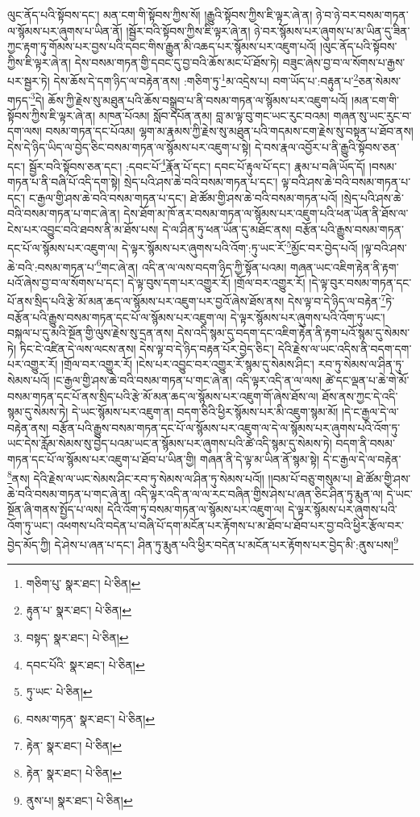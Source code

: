 ལུང་ནོད་པའི་སྟོབས་དང་། མན་ངག་གི་སྟོབས་ཀྱིས་སོ། །རྒྱུའི་སྟོབས་ཀྱིས་ཇི་ལྟར་ཞེ་ན། ཉེ་བ་ཉེ་བར་བསམ་གཏན་ལ་སྙོམས་པར་ཞུགས་པ་ཡིན་ནོ། །སྦྱོར་བའི་སྟོབས་ཀྱིས་ཇི་ལྟར་ཞེ་ན། ཉེ་བར་སྙོམས་པར་ཞུགས་པ་མ་ཡིན་དུ་ཟིན་ཀྱང་རྟག་ཏུ་གོམས་པར་བྱས་པའི་དབང་གིས་རྒྱུན་མི་འཆད་པར་སྙོམས་པར་འཇུག་པའོ། །ལུང་ནོད་པའི་སྟོབས་ཀྱིས་ཇི་ལྟར་ཞེ་ན། དེས་བསམ་གཏན་གྱི་དབང་དུ་བྱ་བའི་ཆོས་མང་པོ་ཐོས་ཏེ། བཟུང་ཞེས་བྱ་བ་ལ་སོགས་པ་རྒྱས་པར་སྦྱར་ཏེ། དེས་ཆོས་དེ་དག་ཉིད་ལ་བརྟེན་ནས། :གཅིག་ཏུ་\footnote{གཅིག་པུ་  སྣར་ཐང་།  པེ་ཅིན། }མ་འདྲེས་པ། བག་ཡོད་པ་:བརྟུན་པ་\footnote{རྟུན་པ་  སྣར་ཐང་།  པེ་ཅིན། }ཅན་སེམས་གཏད་\footnote{བསྟད་  སྣར་ཐང་།  པེ་ཅིན། }དེ། ཆོས་ཀྱི་རྗེས་སུ་མཐུན་པའི་ཆོས་བསྒྲུབ་པ་ནི་བསམ་གཏན་ལ་སྙོམས་པར་འཇུག་པའོ། །མན་ངག་གི་སྟོབས་ཀྱིས་ཇི་ལྟར་ཞེ་ན། མཁན་པོའམ། སློབ་དཔོན་ནམ། བླ་མ་ལྟ་བུ་གང་ཡང་རུང་བའམ། གཞན་སུ་ཡང་རུང་བ་དག་ལས། བསམ་གཏན་དང་པོའམ། ལྷག་མ་རྣམས་ཀྱི་རྗེས་སུ་མཐུན་པའི་གདམས་ངག་རྗེས་སུ་བསྟན་པ་ཐོབ་ནས། དེས་དེ་ཉིད་ཡིད་ལ་བྱེད་ཅིང་བསམ་གཏན་ལ་སྙོམས་པར་འཇུག་པ་སྟེ། དེ་བས་རྣལ་འབྱོར་པ་ནི་རྒྱུའི་སྟོབས་ཅན་དང་། སྦྱོར་བའི་སྟོབས་ཅན་དང་། :དབང་པོ་\footnote{དབང་པོའི་  སྣར་ཐང་།  པེ་ཅིན། }རྣོན་པོ་དང་། དབང་པོ་རྟུལ་པོ་དང་། རྣམ་པ་བཞི་ཡོད་དོ། །བསམ་གཏན་པ་ནི་བཞི་པོ་འདི་དག་སྟེ། སྲེད་པའི་ཤས་ཆེ་བའི་བསམ་གཏན་པ་དང་། ལྟ་བའི་ཤས་ཆེ་བའི་བསམ་གཏན་པ་དང་། ང་རྒྱལ་གྱི་ཤས་ཆེ་བའི་བསམ་གཏན་པ་དང་། ཐེ་ཚོམ་གྱི་ཤས་ཆེ་བའི་བསམ་གཏན་པའོ། །སྲེད་པའི་ཤས་ཆེ་བའི་བསམ་གཏན་པ་གང་ཞེ་ན། དེས་ཐོག་མ་ཁོ་ནར་བསམ་གཏན་ལ་སྙོམས་པར་འཇུག་པའི་ཕན་ཡོན་ནི་ཐོས་ལ་ངེས་པར་འབྱུང་བའི་ཐབས་ནི་མ་ཐོས་པས། དེ་ལ་ཤིན་ཏུ་ཕན་ཡོན་དུ་མཐོང་ནས། བརྩོན་པའི་རྒྱུས་བསམ་གཏན་དང་པོ་ལ་སྙོམས་པར་འཇུག་ལ། དེ་ལྟར་སྙོམས་པར་ཞུགས་པའི་འོག་:ཏུ་ཡང་རོ་\footnote{ཏུ་ཡང་  པེ་ཅིན། }མྱོང་བར་བྱེད་པའོ། །ལྟ་བའི་ཤས་ཆེ་བའི་:བསམ་གཏན་པ་\footnote{བསམ་གཏན་  སྣར་ཐང་།  པེ་ཅིན། }གང་ཞེ་ན། འདི་ན་ལ་ལས་བདག་ཉིད་ཀྱི་སྟོན་པའམ། གཞན་ཡང་འཇིག་རྟེན་ནི་རྟག་པའོ་ཞེས་བྱ་བ་ལ་སོགས་པ་དང་། དེ་ལྟ་བུས་དག་པར་འགྱུར་རོ། །གྲོལ་བར་འགྱུར་རོ། །དེ་ལྟ་བུར་བསམ་གཏན་དང་པོ་ནས་སྲིད་པའི་རྩེ་མོ་མན་ཆད་ལ་སྙོམས་པར་འཇུག་པར་བྱའོ་ཞེས་ཐོས་ནས། དེས་ལྟ་བ་དེ་ཉིད་ལ་བརྟེན་\footnote{རྟེན་  སྣར་ཐང་།  པེ་ཅིན། }ཏེ་བརྩོན་པའི་རྒྱུས་བསམ་གཏན་དང་པོ་ལ་སྙོམས་པར་འཇུག་ལ། དེ་ལྟར་སྙོམས་པར་ཞུགས་པའི་འོག་ཏུ་ཡང་། བསྐལ་པ་དུ་མའི་སྔོན་གྱི་ལུས་རྗེས་སུ་དྲན་ནས། དེས་འདི་སྙམ་དུ་བདག་དང་འཇིག་རྟེན་ནི་རྟག་པའོ་སྙམ་དུ་སེམས་ཏེ། ཏིང་ངེ་འཛིན་དེ་ལས་ལངས་ནས། དེས་ལྟ་བ་དེ་ཉིད་བརྟན་པོར་བྱེད་ཅིང་། དེའི་རྗེས་ལ་ཡང་འདིས་ནི་བདག་དག་པར་འགྱུར་རོ། །གྲོལ་བར་འགྱུར་རོ། །ངེས་པར་འབྱུང་བར་འགྱུར་རོ་སྙམ་དུ་སེམས་ཤིང་། རབ་ཏུ་སེམས་ལ་ཤིན་ཏུ་སེམས་པའོ། །ང་རྒྱལ་གྱི་ཤས་ཆེ་བའི་བསམ་གཏན་པ་གང་ཞེ་ན། འདི་ལྟར་འདི་ན་ལ་ལས། ཚེ་དང་ལྡན་པ་ཆེ་གེ་མོ་བསམ་གཏན་དང་པོ་ནས་སྲིད་པའི་རྩེ་མོ་མན་ཆད་ལ་སྙོམས་པར་འཇུག་གོ་ཞེས་ཐོས་ལ། ཐོས་ནས་ཀྱང་དེ་འདི་སྙམ་དུ་སེམས་ཏེ། དེ་ཡང་སྙོམས་པར་འཇུག་ན། བདག་ཅིའི་ཕྱིར་སྙོམས་པར་མི་འཇུག་སྙམ་མོ། །དེ་ང་རྒྱལ་དེ་ལ་བརྟེན་ནས། བརྩོན་པའི་རྒྱུས་བསམ་གཏན་དང་པོ་ལ་སྙོམས་པར་འཇུག་ལ་དེ་ལ་སྙོམས་པར་ཞུགས་པའི་འོག་ཏུ་ཡང་དེས་རློམ་སེམས་སུ་བྱེད་པའམ་ཡང་ན་སྙོམས་པར་ཞུགས་པའི་ཚེ་འདི་སྙམ་དུ་སེམས་ཏེ། བདག་ནི་བསམ་གཏན་དང་པོ་ལ་སྙོམས་པར་འཇུག་པ་ཐོབ་པ་ཡིན་གྱི། གཞན་ནི་དེ་ལྟ་མ་ཡིན་ནོ་སྙམ་སྟེ། དེ་ང་རྒྱལ་དེ་ལ་བརྟེན་\footnote{རྟེན་  སྣར་ཐང་།  པེ་ཅིན། }ནས། དེའི་རྗེས་ལ་ཡང་སེམས་ཤིང་རབ་ཏུ་སེམས་ལ་ཤིན་ཏུ་སེམས་པའོ།། །།བམ་པོ་བཅུ་གསུམ་པ། ཐེ་ཚོམ་གྱི་ཤས་ཆེ་བའི་བསམ་གཏན་པ་གང་ཞེ་ན། འདི་ལྟར་འདི་ན་ལ་ལ་རང་བཞིན་གྱིས་ཤེས་པ་ཞན་ཅིང་ཤིན་ཏུ་རྨུན་ལ། དེ་ཡང་སྔོན་ཞི་གནས་སྤྱོད་པ་ལས། དེའི་འོག་ཏུ་བསམ་གཏན་ལ་སྙོམས་པར་འཇུག་ལ། དེ་ལྟར་སྙོམས་པར་ཞུགས་པའི་འོག་ཏུ་ཡང་། འཕགས་པའི་བདེན་པ་བཞི་པོ་དག་མངོན་པར་རྟོགས་པ་མ་ཐོབ་པ་ཐོབ་པར་བྱ་བའི་ཕྱིར་རྩོལ་བར་བྱེད་མོད་ཀྱི། དེ་ཤེས་པ་ཞན་པ་དང་། ཤིན་ཏུ་རྨུན་པའི་ཕྱིར་བདེན་པ་མངོན་པར་རྟོགས་པར་བྱེད་མི་:ནུས་པས།\footnote{ནུས་པ།  སྣར་ཐང་།  པེ་ཅིན། } 